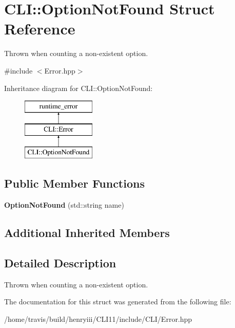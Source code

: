 \hypertarget{struct_c_l_i_1_1_option_not_found}{}\section{C\+LI\+:\+:Option\+Not\+Found Struct Reference}
\label{struct_c_l_i_1_1_option_not_found}


Thrown when counting a non-\/existent option.  




{\ttfamily \#include $<$Error.\+hpp$>$}

Inheritance diagram for C\+LI\+:\+:Option\+Not\+Found\+:\begin{figure}[H]
\begin{center}
\leavevmode
\includegraphics[height=3.000000cm]{struct_c_l_i_1_1_option_not_found}
\end{center}
\end{figure}
\subsection*{Public Member Functions}
\begin{DoxyCompactItemize}
\item 
\mbox{\label{struct_c_l_i_1_1_option_not_found_a0abf448c748239711b5ed963f388ec1d}} 
{\bfseries Option\+Not\+Found} (std\+::string name)
\end{DoxyCompactItemize}
\subsection*{Additional Inherited Members}


\subsection{Detailed Description}
Thrown when counting a non-\/existent option. 

The documentation for this struct was generated from the following file\+:\begin{DoxyCompactItemize}
\item 
/home/travis/build/henryiii/\+C\+L\+I11/include/\+C\+L\+I/Error.\+hpp\end{DoxyCompactItemize}
